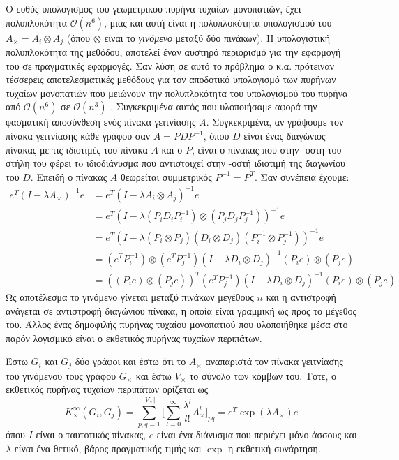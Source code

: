 Ο ευθύς υπολογισμός του γεωμετρικού πυρήνα τυχαίων μονοπατιών, έχει πολυπλοκότητα $\mathcal{O}(n^6)$, μιας και αυτή είναι η πολυπλοκότητα υπολογισμού του $A_{\times}=A_{i}\otimes A_{j}$ (όπου $\otimes$ είναι το \textit{γινόμενο } μεταξύ δύο πινάκων).
Η υπολογιστική πολυπλοκότητα της μεθόδου, αποτελεί έναν αυστηρό περιορισμό για την εφαρμογή του σε πραγματικές εφαρμογές.
Σαν λύση σε αυτό το πρόβλημα ο  κ.α. πρότειναν τέσσερεις αποτελεσματικές μεθόδους για τον αποδοτικό υπολογισμό των πυρήνων τυχαίων μονοπατιών  που μειώνουν την πολυπλοκότητα του υπολογισμού του πυρήνα από $\mathcal{O}(n^6)$ σε $\mathcal{O}(n^3)$ \cite{vishwanathan2010graph}.
Συγκεκριμένα αυτός που υλοποιήσαμε αφορά την φασματική αποσύνθεση ενός πίνακα γειτνίασης $A$.
Συγκεκριμένα, αν γράψουμε τον πίνακα γειτνίασης κάθε γράφου σαν $A=P D P^{-1}$, όπου $D$ είναι ένας διαγώνιος πίνακας με τις ιδιοτιμές του πίνακα $Α$ και ο $P$, είναι ο πίνακας που στην -οστή του στήλη του φέρει τo ιδιοδιάνυσμα που αντιστοιχεί στην -οστή ιδιοτιμή της διαγωνίου του $D$.
Επειδή ο πίνακας $A$ θεωρείται συμμετρικός $P^{-1}=P^{T}$.
Σαν συνέπεια έχουμε:
\begin{equation}
\begin{aligned}
    e^T(I - \lambda A_{\times})^{-1} e & = e^T(I - \lambda A_{i}\otimes A_{j})^{-1} e \\ & = e^T(I - \lambda (P_{i} D_{i} P^{-1}_{i})\otimes (P_{j} D_{j} P^{-1}_{j}))^{-1} e \\
    & = e^T(I - \lambda (P_{i} \otimes P_{j}) (D_{i} \otimes D_{j}) (P^{-1}_{i} \otimes P^{-1}_{j}))^{-1} e \\
    &= (e^T P_{i}^{-1})\otimes (e^T P_{j}^{-1})(I - \lambda D_{i} \otimes D_{j})^{-1} (P_{i} e) \otimes (P_{j} e) \\
    &= ((P_{i} e) \otimes (P_{j} e))^{T} (e^T P_{j}^{-1})(I - \lambda D_{i} \otimes D_{j})^{-1} (P_{i} e) \otimes (P_{j} e)
\end{aligned}
\end{equation}
Ως αποτέλεσμα το γινόμενο  γίνεται μεταξύ πινάκων μεγέθους $n$ και η αντιστροφή ανάγεται σε αντιστροφή διαγώνιου πίνακα, η οποία είναι γραμμική ως προς το μέγεθος του.
Άλλος ένας δημοφιλής πυρήνας τυχαίου μονοπατιού που υλοποιήθηκε μέσα στο παρόν λογισμικό είναι ο εκθετικός πυρήνας τυχαίων περιπάτων.
\begin{definition}
	Έστω $G_i$ και $G_j$ δύο γράφοι και έστω ότι το $A_\times$ αναπαριστά τον πίνακα γειτνίασης του γινόμενου τους γράφου $G_\times$ και έστω $V_\times$ το σύνολο των κόμβων του.
	Τότε, ο εκθετικός πυρήνας τυχαίων περιπάτων ορίζεται ως
	\begin{equation}
    	K_{\times}^{\infty}(G_i,G_j) = \sum_{p,q=1}^{|V_{\times}|} \Big[ \sum_{l=0}^{\infty} \frac{\lambda^l}{l!} A_{\times}^l \Big]_{pq} = e^T \exp(\lambda A_{\times}) e
    \end{equation}
	όπου $I$ είναι ο ταυτοτικός πίνακας, $e$ είναι ένα διάνυσμα που περιέχει μόνο άσσους και $\lambda$ είναι ένα θετικό, βάρος πραγματικής τιμής και $\exp$ η εκθετική συνάρτηση.
\end{definition}
